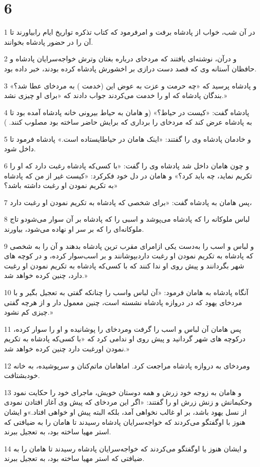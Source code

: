 \chapter{6}

\par 1 در آن شب، خواب از پادشاه برفت و امرفرمود که کتاب تذکره تواریخ ایام رابیاورند تا آن را در حضور پادشاه بخوانند.
\par 2 و درآن، نوشته‌ای یافتند که مردخای درباره بغتان وترش خواجه‌سرایان پادشاه و حافظان آستانه وی که قصد دست درازی بر اخشورش پادشاه کرده بودند، خبر داده بود.
\par 3 و پادشاه پرسید که «چه حرمت و عزت به عوض این (خدمت ) به مردخای عطا شد؟» بندگان پادشاه که او را خدمت می‌کردند جواب دادند که «برای او چیزی نشد.»
\par 4 پادشاه گفت: «کیست در حیاط؟» (و هامان به حیاط بیرونی خانه پادشاه آمده بود تا به پادشاه عرض کند که مردخای را برداری که برایش حاضر ساخته بود مصلوب کنند. )
\par 5 و خادمان پادشاه وی را گفتند: «اینک هامان در حیاطایستاده است.» پادشاه فرمود تا داخل شود.
\par 6 و چون هامان داخل شد پادشاه وی را گفت: «با کسی‌که پادشاه رغبت دارد که او را تکریم نماید، چه باید کرد؟» و هامان در دل خود فکرکرد: «کیست غیر از من که پادشاه به تکریم نمودن او رغبت داشته باشد؟»
\par 7 پس هامان به پادشاه گفت: «برای شخصی که پادشاه به تکریم نمودن او رغبت دارد،
\par 8 لباس ملوکانه را که پادشاه می‌پوشد و اسبی را که پادشاه بر آن سوار می‌شودو تاج ملوکانه‌ای را که بر سر او نهاده می‌شود، بیاورند.
\par 9 و لباس و اسب را به‌دست یکی ازامرای مقرب ترین پادشاه بدهند و آن را به شخصی که پادشاه به تکریم نمودن او رغبت داردبپوشانند و بر اسب‌سوار کرده، و در کوچه های شهر بگردانند و پیش روی او ندا کنند که با کسی‌که پادشاه به تکریم نمودن او رغبت دارد، چنین کرده خواهد شد.»
\par 10 آنگاه پادشاه به هامان فرمود: «آن لباس واسب را چنانکه گفتی به تعجیل بگیر و با مردخای یهود که در دروازه پادشاه نشسته است، چنین معمول دار و از هرچه گفتی چیزی کم نشود.»
\par 11 پس هامان آن لباس و اسب را گرفت ومردخای را پوشانیده و او را سوار کرده، درکوچه های شهر گردانید و پیش روی او ندامی کرد که «با کسی‌که پادشاه به تکریم نمودن اورغبت دارد چنین کرده خواهد شد.»
\par 12 ومردخای به دروازه پادشاه مراجعت کرد. اماهامان ماتم‌کنان و سرپوشیده، به خانه خودبشتافت.
\par 13 و هامان به زوجه خود زرش و همه دوستان خویش، ماجرای خود را حکایت نمود وحکیمانش و زنش زرش او را گفتند: «اگر این مردخای که پیش وی آغاز افتادن نمودی از نسل یهود باشد، بر او غالب نخواهی آمد، بلکه البته پیش او خواهی افتاد.»و ایشان هنوز با اوگفتگو می‌کردند که خواجه‌سرایان پادشاه رسیدند تا هامان را به ضیافتی که استر مهیا ساخته بود، به تعجیل ببرند.
\par 14 و ایشان هنوز با اوگفتگو می‌کردند که خواجه‌سرایان پادشاه رسیدند تا هامان را به ضیافتی که استر مهیا ساخته بود، به تعجیل ببرند.
 
